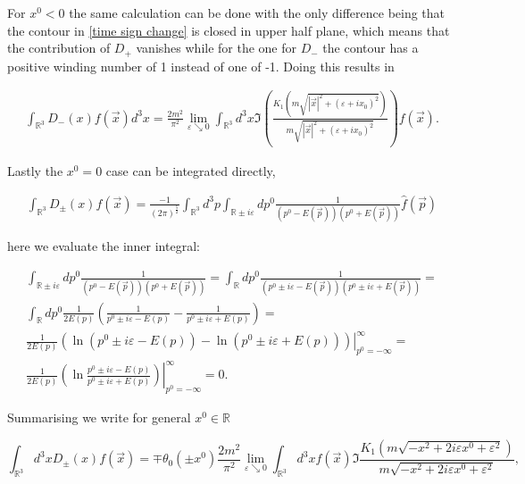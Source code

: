 \documentclass[a4paper,11pt]{article}
\begin{document}
For \(x^0<0\) the same calculation can be done with the only difference being that the contour in \eqref{time sign change} is closed in
upper half plane, which means that the contribution of \(D_+\) vanishes while for the one for \(D_-\) the contour has 
a positive winding number of 1 instead of one of -1. Doing this results in 

\begin{align}
\int_{\mathbb{R}^3} D_-(x)f(\vec{x})d^3x
  =\frac{2 m^2}{\pi^2} \lim_{\varepsilon \searrow 0} \int_{\mathbb{R}^3} d^3x \Im\left( \frac{K_1\left(m \sqrt{|\vec{x}|^2 + (\varepsilon + i x_0)^2}\right)}{m \sqrt{|\vec{x}|^2 + (\varepsilon + i x_0)^2}}
  \right) f(\vec{x}).
  \end{align}

Lastly the \(x^0=0\) case can be integrated directly,

\begin{align}
\int_{\mathbb{R}^3} D_{\pm}(x) f(\vec{x})
=\frac{-1}{(2\pi)^{\frac{5}{2}}} \int_{\mathbb{R}^3} d^3p \int_{\mathbb{R}\pm i \varepsilon}dp^0 \frac{1}{(p^0-E(\vec{p}))(p^0+E(\vec{p}))}\hat{f}(\vec{p})
\end{align}

here we evaluate the inner integral:

\begin{align}
\int_{\mathbb{R}\pm i \varepsilon}dp^0 \frac{1}{(p^0-E(\vec{p}))(p^0+E(\vec{p}))}=
\int_{\mathbb{R}}dp^0 \frac{1}{(p^0\pm i \varepsilon-E(\vec{p}))(p^0\pm i \varepsilon+E(\vec{p}))}=\\
\int_\mathbb{R} dp^0 \frac{1}{2 E(p)} \left( \frac{1}{p^0\pm i \varepsilon -E(p)} - \frac{1}{p^0 \pm i \varepsilon + E(p)}\right)=\\
\frac{1}{2E(p)} \left.\left( \ln (p^0\pm i\varepsilon -E(p)) - \ln (p^0 \pm i \varepsilon + E(p))\right)\right|_{p^0=-\infty}^\infty=\\
\frac{1}{2E(p)} \left.\left( \ln\frac{ p^0\pm i\varepsilon -E(p)}{p^0 \pm i \varepsilon + E(p)}\right)\right|_{p^0=-\infty}^\infty=0.
\end{align}


Summarising we write for general \(x^0\in \mathbb{R}\)

\begin{equation}\label{ImK1}
\int_{\mathbb{R}^3}d^3 x D_\pm (x) f(\vec{x}) = 
\mp \theta_0(\pm x^0) \frac{2 m^2}{\pi^2} \lim_{\varepsilon \searrow 0} \int_{\mathbb{R}^3}d^3 x f(\vec{x}) \Im 
\frac{K_1(m \sqrt{-x^2 +2 i \varepsilon x^0 + \varepsilon^2})}{m \sqrt{-x^2 +2 i \varepsilon x^0 + \varepsilon^2}},
\end{equation}
\end{document}
